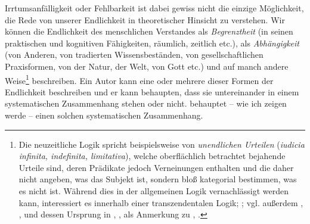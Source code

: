 Irrtumsanfälligkeit oder Fehlbarkeit ist dabei gewiss nicht die
einzige Möglichkeit, die Rede von unserer Endlichkeit in theoretischer
Hinsicht zu verstehen. Wir können die Endlichkeit des menschlichen
Verstandes als \textit{Begrenztheit} (in seinen praktischen und kognitiven
Fähigkeiten, räumlich, zeitlich etc.), als \textit{Abhängigkeit} (von Anderen,
von tradierten Wissensbeständen, von gesellschaftlichen Praxisformen, von der
Natur, der Welt, von Gott etc.) und auf manch andere Weise\footnote{Die
neuzeitliche Logik spricht beispielsweise von \emph{unendlichen Urteilen}
(\emph{iudicia infinita, indefinita, limitativa}), welche
oberflächlich betrachtet bejahende Urteile sind, deren Prädikate
jedoch Verneinungen enthalten und die daher
nicht angeben, was das Subjekt ist, sondern bloß kategorial bestimmen, was es nicht ist. Während dies
in der allgemeinen Logik vernachlässigt werden kann, interessiert es innerhalb
einer transzendentalen Logik; {\cite[vgl.][B
97\,f.,]{Kant:KritikderreinenVernunft2003} \cite[][III:
88.3--32]{Kant:GesammelteWerke1900ff.}; vgl. außerdem \cite[][A
160--162]{Kant:ImmanuelKantsLogik1977}, \cite[][IX:
103.23--104.24]{Kant:GesammelteWerke1900ff.}, und dessen Ursprung in
\cite[][]{Kant:Reflexionen1900ff.}, \cite[][XVI:
639.2--5]{Kant:GesammelteWerke1900ff.}, als Anmerkung zu
\textcite[][\S~294]{Meier:AuszugausderVernunftlehre1752},
\cite[][XVI: 635.19--22, 636.14--22]{Kant:GesammelteWerke1900ff.}}.}
beschreiben. Ein Autor kann eine oder mehrere dieser Formen der Endlichkeit
beschreiben und er kann behaupten, dass sie untereinander in einem systematischen Zusammenhang
stehen oder nicht.  behauptet -- wie ich zeigen werde --
einen solchen systematischen Zusammenhang.

